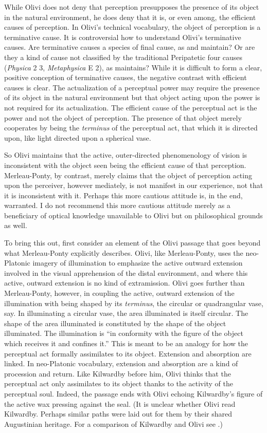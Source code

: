 While Olivi does not deny that perception presupposes the presence of its object in the natural environment, he does deny that it is, or even among, the efficient causes of perception. In Olivi's technical vocabulary, the object of perception is a terminative cause. It is controversial how to understand Olivi's terminative causes. Are terminative causes a species of final cause, as \citet[192--195]{Kent:1984zm} and \citet{Pasnau:1999kn} maintain? Or are they a kind of cause not classified by the traditional Peripatetic four causes (\emph{Physica} 2 3, \emph{Metaphysica} E 2), as \citet[chapter 6]{Toivanen:2013ul} maintains? While it is difficult to form a clear, positive conception of terminative causes, the negative contrast with efficient causes is clear. The actualization of a perceptual power may require the presence of its object in the natural environment but that object acting upon the power is not required for its actualization. The efficient cause of the perceptual act is the power and not the object of perception. The presence of that object merely cooperates by being the \emph{terminus} of the perceptual act, that which it is directed upon, like light directed upon a spherical vase.

So Olivi maintains that the active, outer-directed phenomenology of vision is inconsistent with the object seen being the efficient cause of that perception. Merleau-Ponty, by contrast, merely claims that the object of perception acting upon the perceiver, however mediately, is not manifest in our experience, not that it is inconsistent with it. Perhaps this more cautious attitude is, in the end, warranted. I do not recommend this more cautious attitude merely as a beneficiary of optical knowledge unavailable to Olivi but on philosophical grounds as well.

To bring this out, first consider an element of the Olivi passage that goes beyond what Merleau-Ponty explicitly describes. Olivi, like Merleau-Ponty, uses the neo-Platonic imagery of illumination to emphasize the active outward extension involved in the visual apprehension of the distal environment, and where this active, outward extension is no kind of extramission. Olivi goes further than Merleau-Ponty, however, in coupling the active, outward extension of the illumination with being shaped by its \emph{terminus}, the circular or quadrangular vase, say. In illuminating a circular vase, the area illuminated is itself circular. The shape of the area illuminated is constituted by the shape of the object illuminated. The illumination is ``in conformity with the figure of the object which receives it and confines it.'' This is meant to be an analogy for how the perceptual act formally assimilates to its object. Extension and absorption are linked. In neo-Platonic vocabulary, extension and absorption are a kind of procession and return. Like Kilwardby before him, Olivi thinks that the perceptual act only assimilates to its object thanks to the activity of the perceptual soul. Indeed, the passage ends with Olivi echoing Kilwardby's figure of the active wax pressing against the seal. (It is unclear whether Olivi read Kilwardby. Perhaps similar paths were laid out for them by their shared Augustinian heritage. For a comparison of Kilwardby and Olivi see \citealt{Silva:2010zh}.)

